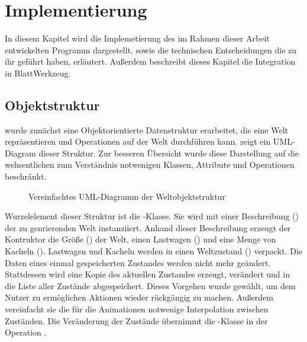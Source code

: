\chapter{Implementierung}
\label{sec:implementation}

In diesem Kapitel wird die Implemetierung des im Rahmen dieser Arbeit entwickelten Programm dargestellt, sowie die technischen Entscheidungen die zu ihr geführt haben, erläutert. Außerdem beschreibt dieses Kapitel die Integration in BlattWerkzeug.

\section{Objektstruktur}
\label{sec:implementation:structure}

\TODO{} wurde zunächst eine Objektorientierte Datenstruktur erarbeitet, die eine Welt repräsentieren und Operationen auf der Welt durchführen kann.  zeigt ein UML-Diagram dieser Struktur. Zur besseren Übersicht wurde diese Darstellung auf die wehsentlichen zum Verständnis notwenigen Klassen, Attribute und Operationen beschränkt.

\begin{figure}
  
  \caption{Vereinfachtes UML-Diagramm der Weltobjektstruktur}
  \label{fig:implementation:structure:uml}
\end{figure}

Wurzelelement dieser Struktur ist die -Klasse. Sie wird mit einer Beschreibung () der zu genrierenden Welt instanziiert. Anhand dieser Beschreibung erzeugt der Kontruktor die Größe () der Welt, einen Lastwagen () und eine Menge von Kacheln (). Lastwagen und Kacheln werden in einen Weltzustand () verpackt. Die Daten eines einmal gespeicherten Zustandes werden nicht mehr geändert. Stattdessen wird eine Kopie des aktuellen Zustandes erzeugt, verändert und in die Liste aller Zustände abgespeichert. Dieses Vorgehen wurde gewählt, um dem Nutzer zu ermöglichen Aktionen wieder rückgängig zu machen. Außerdem vereinfacht sie die für die Animationen  notwenige Interpolation zwischen Zuständen. Die Veränderung der Zustände übernimmt die -Klasse in der Operation .


